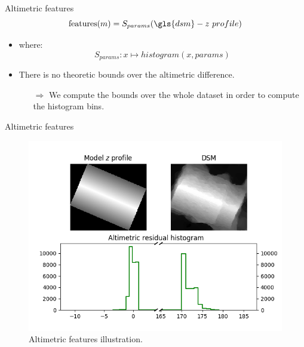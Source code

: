 \documentclass{beamer}
\begin{document}
            \begin{frame}{Altimetric features}
                \begin{equation}\label{eq::feature_vec}
                    \text{features}(m) = S_{params}(\gls{dsm} - z\ profile)
                \end{equation}
                \begin{itemize}[itemsep=5em]
                    \item where:
                    \begin{equation*}
                        S_{params}: x \mapsto histogram(x, params)
                    \end{equation*}
                    \item There is no theoretic bounds over the altimetric difference.
                    \begin{itemize}[font=\color{IGNDarkOrange}]
                        \item[$\Rightarrow$] We compute the bounds over the whole dataset in order to compute the histogram bins.
                    \end{itemize}
                \end{itemize}
            \end{frame}
            \begin{frame}{Altimetric features}
                \begin{figure}
                    \includegraphics[height=.7\textheight]{images/altimetric_features}
                    \caption{\label{fig::altimetric} Altimetric features illustration.}
                \end{figure}
            \end{frame}
\end{document}
